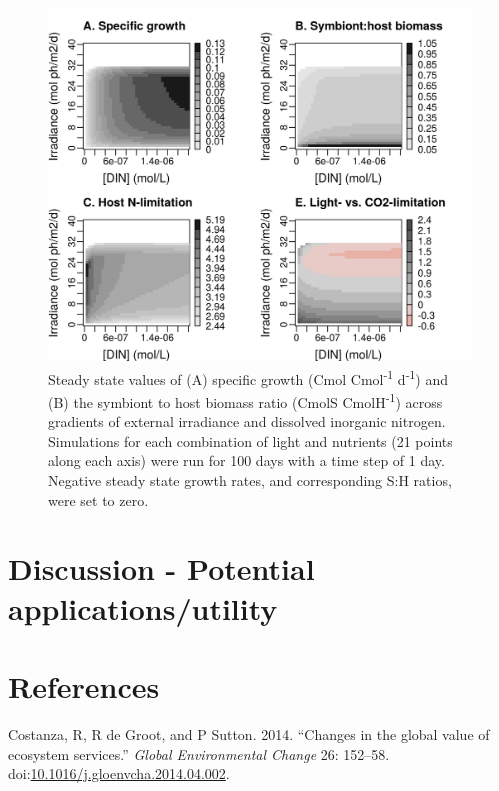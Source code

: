 \documentclass[]{elsarticle} %
\makeatletter
\def\maxwidth{\ifdim\Gin@nat@width>\linewidth\linewidth
\else\Gin@nat@width\fi}
\let\Oldincludegraphics\includegraphics
\renewcommand{\includegraphics}[1]{\Oldincludegraphics[width=\maxwidth]{#1}}
\makeatother
\begin{document}
\begin{figure}[htbp]
\centering
\includegraphics{../img/Fig2.png}
\caption{Steady state values of (A) specific growth (Cmol
Cmol\textsuperscript{-1} d\textsuperscript{-1}) and (B) the symbiont to
host biomass ratio (CmolS CmolH\textsuperscript{-1}) across gradients of
external irradiance and dissolved inorganic nitrogen. Simulations for
each combination of light and nutrients (21 points along each axis) were
run for 100 days with a time step of 1 day. Negative steady state growth
rates, and corresponding S:H ratios, were set to zero.}
\end{figure}

\section{Discussion - Potential
applications/utility}\label{discussion---potential-applicationsutility}

\section*{References}\label{references}

\hypertarget{refs}{}
\hypertarget{ref-Costanza:2014ex}{}
Costanza, R, R de Groot, and P Sutton. 2014. ``Changes in the global
value of ecosystem services.'' \emph{Global Environmental Change} 26:
152--58.
doi:\href{https://doi.org/10.1016/j.gloenvcha.2014.04.002}{10.1016/j.gloenvcha.2014.04.002}.
\end{document}
